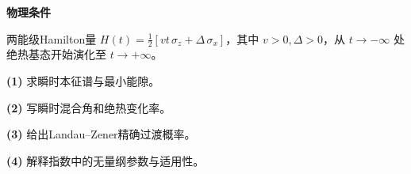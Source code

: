 \textbf{物理条件}\par 两能级Hamilton量 \(H(t)=\tfrac12[vt\,\sigma_z+\Delta\,\sigma_x]\)，其中 \(v>0,\Delta>0\)，从 \(t\to-\infty\) 处绝热基态开始演化至 \(t\to+\infty\)。
\par\noindent\textbf{(1)} 求瞬时本征谱与最小能隙。
\par\noindent\textbf{(2)} 写瞬时混合角和绝热变化率。
\par\noindent\textbf{(3)} 给出Landau–Zener精确过渡概率。
\par\noindent\textbf{(4)} 解释指数中的无量纲参数与适用性。
